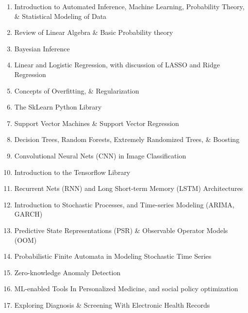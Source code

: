 \documentclass[10pt,onecolumn,compsoc]{IEEEtran}
\begin{document}
\begin{enumerate}\bf\sffamily\fontsize{9}{11}\selectfont
\COLA
\item Introduction to Automated Inference, Machine Learning, Probability Theory, \& Statistical Modeling of Data
\COLB
\item Review of Linear Algebra \&  Basic Probability theory
\item Bayesian Inference 
\item Linear and Logistic Regression, with discussion of  LASSO and Ridge Regression  
\item Concepts of Overfitting, \& Regularization
\COLA
\item The SkLearn Python Library
\item Support Vector Machines \& Support Vector Regression
\item Decision Trees, Random Forests, Extremely Randomized Trees, \& Boosting 
\COLB
\item Convolutional Neural Nets (CNN)  in Image Classification
\item Introduction to the Tensorflow Library 
\item Recurrent Nets (RNN) and Long Short-term Memory (LSTM) Architectures 
\COLA
\item Introduction to Stochastic Processes, and Time-series Modeling (ARIMA, GARCH)
\item Predictive State Representations (PSR) \& Observable Operator Models (OOM)
\item Probabilistic Finite Automata in Modeling Stochastic Time Series
\COLB
\item Zero-knowledge Anomaly Detection 
\item ML-enabled Tools In Personalized Medicine, and social policy optimization
\item Exploring Diagnosis \& Screening With Electronic Health Records
\end{enumerate}

\renewcommand\refname{Texts}
\fontsize{7}{9}\selectfont
\nocite{*}


\end{document}

